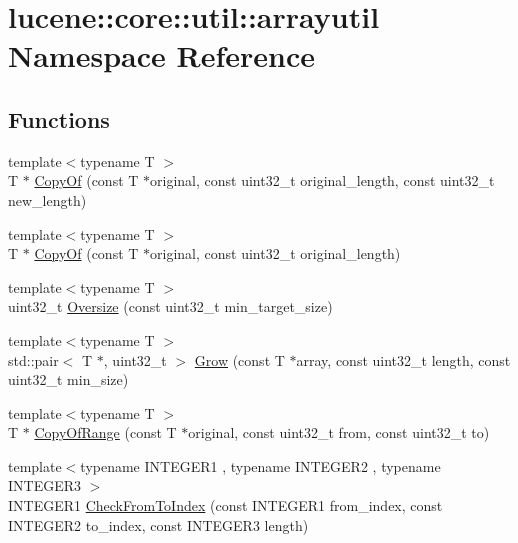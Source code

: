 \hypertarget{namespacelucene_1_1core_1_1util_1_1arrayutil}{}\section{lucene\+:\+:core\+:\+:util\+:\+:arrayutil Namespace Reference}
\label{namespacelucene_1_1core_1_1util_1_1arrayutil}
\subsection*{Functions}
\begin{DoxyCompactItemize}
\item 
{\footnotesize template$<$typename T $>$ }\\T $\ast$ \mbox{\hyperlink{namespacelucene_1_1core_1_1util_1_1arrayutil_a42793db2e08af25c01c19eb099ec7d1d}{Copy\+Of}} (const T $\ast$original, const uint32\+\_\+t original\+\_\+length, const uint32\+\_\+t new\+\_\+length)
\item 
{\footnotesize template$<$typename T $>$ }\\T $\ast$ \mbox{\hyperlink{namespacelucene_1_1core_1_1util_1_1arrayutil_a5a4d6233afed538be3d004f5bd14375b}{Copy\+Of}} (const T $\ast$original, const uint32\+\_\+t original\+\_\+length)
\item 
{\footnotesize template$<$typename T $>$ }\\uint32\+\_\+t \mbox{\hyperlink{namespacelucene_1_1core_1_1util_1_1arrayutil_a88b54ef3001bf083cb1262383618c841}{Oversize}} (const uint32\+\_\+t min\+\_\+target\+\_\+size)
\item 
{\footnotesize template$<$typename T $>$ }\\std\+::pair$<$ T $\ast$, uint32\+\_\+t $>$ \mbox{\hyperlink{namespacelucene_1_1core_1_1util_1_1arrayutil_a7776f2f4497c07c79bfd8767a3b505d0}{Grow}} (const T $\ast$array, const uint32\+\_\+t length, const uint32\+\_\+t min\+\_\+size)
\item 
{\footnotesize template$<$typename T $>$ }\\T $\ast$ \mbox{\hyperlink{namespacelucene_1_1core_1_1util_1_1arrayutil_a107a721d94f4e31167dc49e3b07ac859}{Copy\+Of\+Range}} (const T $\ast$original, const uint32\+\_\+t from, const uint32\+\_\+t to)
\item 
{\footnotesize template$<$typename I\+N\+T\+E\+G\+E\+R1 , typename I\+N\+T\+E\+G\+E\+R2 , typename I\+N\+T\+E\+G\+E\+R3 $>$ }\\I\+N\+T\+E\+G\+E\+R1 \mbox{\hyperlink{namespacelucene_1_1core_1_1util_1_1arrayutil_a18335a8c7e46732362ebbf7dedb060f9}{Check\+From\+To\+Index}} (const I\+N\+T\+E\+G\+E\+R1 from\+\_\+index, const I\+N\+T\+E\+G\+E\+R2 to\+\_\+index, const I\+N\+T\+E\+G\+E\+R3 length)

\end{DoxyCompactItemize}
